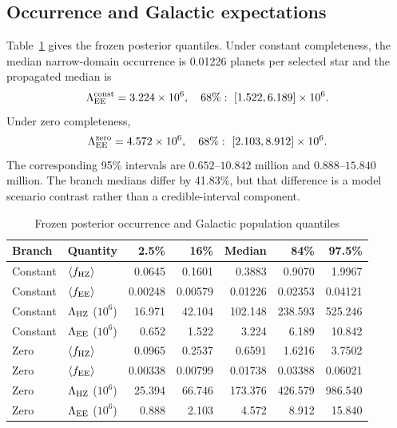 \subsection{Occurrence and Galactic expectations}

Table~\ref{tab:posterior_results} gives the frozen posterior quantiles. Under
constant completeness, the median narrow-domain occurrence is 0.01226 planets
per selected star and the propagated median is
\begin{equation}
 \Lambda_{\rm EE}^{\rm const}=3.224\times10^6,
 \quad 68\%:\ [1.522,6.189]\times10^6.
 \label{eq:canonical_results}
\end{equation}
Under zero completeness,
\begin{equation}
 \Lambda_{\rm EE}^{\rm zero}=4.572\times10^6,
 \quad 68\%:\ [2.103,8.912]\times10^6.
 \label{eq:zero_results}
\end{equation}
The corresponding 95\% intervals are $0.652$--$10.842$ million and
$0.888$--$15.840$ million. The branch medians differ by 41.83\%, but that
difference is a model scenario contrast rather than a credible-interval
component.

\begin{table}[t]
\caption{Frozen posterior occurrence and Galactic population quantiles}
\label{tab:posterior_results}
\centering
\small
\setlength{\tabcolsep}{5pt}
\begin{tabular}{llrrrrr}
\toprule
Branch & Quantity & 2.5\% & 16\% & Median & 84\% & 97.5\%\\
\midrule
Constant & $\langle f_{\rm HZ}\rangle$ & 0.0645 & 0.1601 & 0.3883 & 0.9070 & 1.9967\\
Constant & $\langle f_{\rm EE}\rangle$ & 0.00248 & 0.00579 & 0.01226 & 0.02353 & 0.04121\\
Constant & $\Lambda_{\rm HZ}$ ($10^6$) & 16.971 & 42.104 & 102.148 & 238.593 & 525.246\\
Constant & $\Lambda_{\rm EE}$ ($10^6$) & 0.652 & 1.522 & 3.224 & 6.189 & 10.842\\
\midrule
Zero & $\langle f_{\rm HZ}\rangle$ & 0.0965 & 0.2537 & 0.6591 & 1.6216 & 3.7502\\
Zero & $\langle f_{\rm EE}\rangle$ & 0.00338 & 0.00799 & 0.01738 & 0.03388 & 0.06021\\
Zero & $\Lambda_{\rm HZ}$ ($10^6$) & 25.394 & 66.746 & 173.376 & 426.579 & 986.540\\
Zero & $\Lambda_{\rm EE}$ ($10^6$) & 0.888 & 2.103 & 4.572 & 8.912 & 15.840\\
\bottomrule
\end{tabular}
\end{table}

